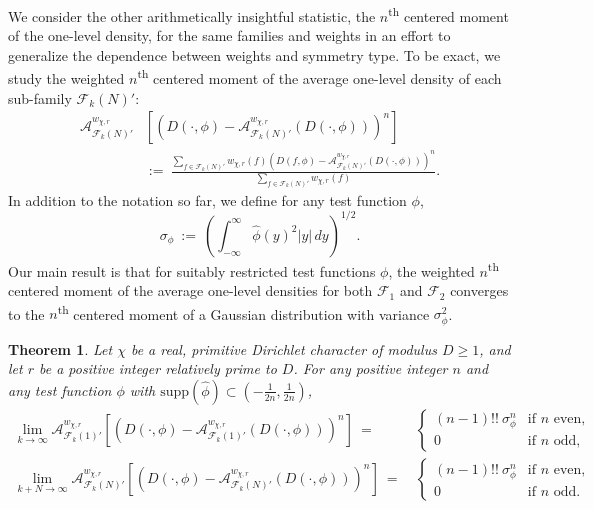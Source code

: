 \documentclass[12pt, reqno,oneside]{amsart}
\theoremstyle{plain}
\newtheorem{theorem}{Theorem}[section]
\theoremstyle{definition}
\theoremstyle{remark}
\theoremstyle{plain}
\numberwithin{equation}{section}
\begin{document}
We consider the other arithmetically insightful statistic, the $n$\textsuperscript{th} centered moment of the one-level density, for the same families and weights in an effort to generalize the dependence between weights and symmetry type. To be exact, we study the weighted $n$\textsuperscript{th} centered moment of the average one-level density of each sub-family $\mathcal{F}_k(N)'$:
\begin{align}\label{eq:average-moment}\nonumber
\mathcal{A}^{w_{\chi,r}}_{\mathcal{F}_k(N)'}&\left[\left(D(\cdot,\phi)-\mathcal{A}^{w_{\chi,r}}_{\mathcal{F}_k(N)'}(D(\cdot,\phi))\right)^n\right] \\
&:= \  \frac{\sum_{f\in\mathcal{F}_k(N)'}w_{\chi,r}(f)\left(D(f,\phi)-\mathcal{A}^{w_{\chi,r}}_{\mathcal{F}_k(N)'}(D(\cdot,\phi))\right)^n}{\sum_{f\in\mathcal{F}_k(N)'}w_{\chi,r}(f)}.
\end{align}
In addition to the notation so far, we define for any test function $\phi$, 
\begin{equation}
    \sigma_\phi \ := \ \left(\int_{-\infty}^\infty \widehat\phi(y)^2 |y| \, dy\right)^{1/2}.
\end{equation}
Our main result is that for suitably restricted test functions $\phi$, the weighted $n$\textsuperscript{th} centered moment of the average one-level densities for both $\mathcal{F}_1$ and $\mathcal{F}_2$ converges to the $n$\textsuperscript{th} centered moment of a Gaussian distribution with variance $\sigma_\phi^2$. 
\begin{theorem}\label{thm:main-thm} 
Let $\chi$ be a real, primitive Dirichlet character of modulus $D\geq1$, and let $r$ be a positive integer relatively prime to $D$. For any positive integer $n$ and any test function $\phi$ with $\text{supp}(\widehat{\phi})\subset\left(-\frac{1}{2n},\frac{1}{2n}\right)$,
    \begin{align}\label{eq:main-formula-1}
    \lim_{k\to\infty}\mathcal{A}^{w_{\chi,r}}_{\mathcal{F}_k(1)'}\left[\left(D(\cdot,\phi)-\mathcal{A}^{w_{\chi,r}}_{\mathcal{F}_k(1)'}(D(\cdot,\phi))\right)^n\right] \ = \ 
    &\begin{cases}
    (n-1)!! \ \sigma_{\phi}^n & \text{if } n \text{ even}, \\ 
    0 & \text{if } n \text{ odd},
    \end{cases}\\
    \label{eq:main-formula-2} \lim_{k+N\to\infty}\mathcal{A}^{w_{\chi,r}}_{\mathcal{F}_k(N)'}\left[\left(D(\cdot,\phi)-\mathcal{A}^{w_{\chi,r}}_{\mathcal{F}_k(N)'}(D(\cdot,\phi))\right)^n\right] \ = \ 
    &\begin{cases}
    (n-1)!! \ \sigma_{\phi}^n & \text{if } n \text{ even}, \\ 
    0 & \text{if } n \text{ odd}.
    \end{cases}
    \end{align}
\end{theorem}
\end{document}
